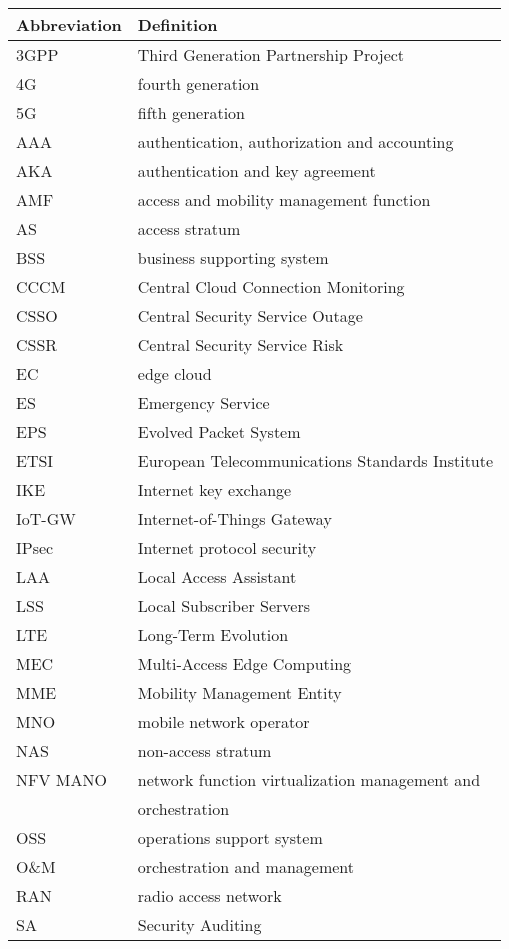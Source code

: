 \documentclass{ieeeaccess}
\begin{document}
	\begin{table}[!htbp]\label{tab:acronyms}
		\begin{tabular}{ll}
			\toprule[1.5px]
			Abbreviation&Definition\\
			\midrule[1.2px]
			3GPP&Third Generation Partnership Project \\
			4G&fourth generation\\
			5G&fifth generation\\
			AAA&authentication, authorization and accounting\\
			AKA&authentication and key agreement\\
			AMF&access and mobility management function\\
			AS&access stratum\\
			BSS&business supporting system\\
			CCCM&Central Cloud Connection Monitoring\\
			CSSO&Central Security Service Outage\\
			CSSR&Central Security Service Risk\\
			EC&edge cloud\\
			ES&Emergency Service\\
			EPS&Evolved Packet System\\
			ETSI&European Telecommunications Standards Institute\\
			IKE&Internet key exchange \\
			IoT-GW&Internet-of-Things Gateway\\
			IPsec&Internet protocol security\\
			LAA&Local Access Assistant\\
			LSS&Local Subscriber Servers\\
			LTE&Long-Term Evolution\\
			MEC&Multi-Access Edge Computing\\
			MME&Mobility Management Entity\\
			MNO&mobile network operator\\
			NAS&non-access stratum\\
			NFV MANO&network function virtualization management and\\
			&orchestration\\
			OSS&operations support system\\
			O\&M&orchestration and management\\
			RAN&radio access network\\
			SA&Security Auditing\\

\end{tabular}
\end{table}
\end{document}

